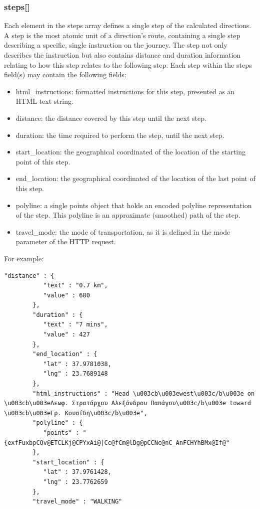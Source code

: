 \subsubsection{steps[]}

Each element in the steps array defines a single step of the calculated directions. A step is the most 
atomic unit of a direction's route, containing a single step describing a specific, single instruction on the journey. 
The step not only describes the instruction but also contains distance and duration information relating to how this step relates to the following step. 
Each step within the steps field(s) may contain the following fields:

\begin{itemize}
 \item html\_instructions: formatted instructions for this step, presented as an HTML text string. 
 \item distance: the distance covered by this step until the next step.
 \item duration: the time required to perform the step, until the next step.
 \item start\_location: the geographical coordinated of the location of the starting point of this step.
 \item end\_location: the geographical coordinated of the location of the last point of this step.
 \item polyline: a single points object that holds an encoded polyline representation of the step. This polyline is an approximate (smoothed) path of the step.
 \item travel\_mode: the mode of transportation, as it is defined in the mode parameter of the HTTP request.
\end{itemize}

For example:

\begin{lstlisting}[basicstyle=\footnotesize\ttfamily, breaklines=true]
	"distance" : {
           "text" : "0.7 km",
           "value" : 680
        },
        "duration" : {
           "text" : "7 mins",
           "value" : 427
        },
        "end_location" : {
           "lat" : 37.9781038,
           "lng" : 23.7689148
        },
        "html_instructions" : "Head \u003cb\u003ewest\u003c/b\u003e on \u003cb\u003eΛεωφ. Στρατάρχου Αλεξάνδρου Παπάγου\u003c/b\u003e toward \u003cb\u003eΓρ. Κουσίδη\u003c/b\u003e",
        "polyline" : {
           "points" : "{exfFuxbpCQv@ETCLKj@CPYxAi@|Cc@fCm@lDg@pCCNc@nC_AnFCHYhBMx@If@"
        },
        "start_location" : {
           "lat" : 37.9761428,
           "lng" : 23.7762659
        },
        "travel_mode" : "WALKING"
\end{lstlisting}


